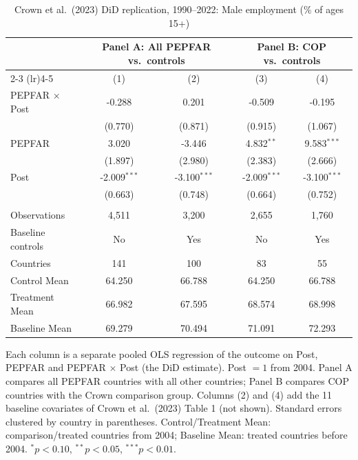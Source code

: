 
\begin{table}[htbp]
   \caption{\label{tab:crown_did_emp_male} Crown et al.\ (2023) DiD replication, 1990--2022: Male employment (\% of ages 15+)}
   \bigskip
   \centering
   \begin{tabular}{lcccc}
      \toprule
       & \multicolumn{2}{c}{Panel A: All PEPFAR vs.\ controls} & \multicolumn{2}{c}{Panel B: COP vs.\ controls} \\ \cmidrule(lr){2-3} \cmidrule(lr){4-5}
                            & (1)            & (2)            & (3)            & (4)\\  
      \midrule 
      PEPFAR $\times$ Post  & -0.288         & 0.201          & -0.509         & -0.195\\   
                            & (0.770)        & (0.871)        & (0.915)        & (1.067)\\   
      PEPFAR                & 3.020          & -3.446         & 4.832$^{**}$   & 9.583$^{***}$\\   
                            & (1.897)        & (2.980)        & (2.383)        & (2.666)\\   
      Post                  & -2.009$^{***}$ & -3.100$^{***}$ & -2.009$^{***}$ & -3.100$^{***}$\\   
                            & (0.663)        & (0.748)        & (0.664)        & (0.752)\\   
       \\
      Observations          & 4,511          & 3,200          & 2,655          & 1,760\\  
      Baseline controls     & No             & Yes            & No             & Yes\\  
      Countries             & 141            & 100            & 83             & 55\\  
      Control Mean          & 64.250         & 66.788         & 64.250         & 66.788\\  
      Treatment Mean        & 66.982         & 67.595         & 68.574         & 68.998\\  
      Baseline Mean         & 69.279         & 70.494         & 71.091         & 72.293\\  
      \bottomrule
   \end{tabular}
   
   \par \raggedright 
   Each column is a separate pooled OLS regression of the outcome on Post, PEPFAR and PEPFAR $\times$ Post (the DiD estimate). Post $= 1$ from 2004. Panel A compares all PEPFAR countries with all other countries; Panel B compares COP countries with the Crown comparison group. Columns (2) and (4) add the 11 baseline covariates of Crown et al.\ (2023) Table 1 (not shown). Standard errors clustered by country in parentheses. Control/Treatment Mean: comparison/treated countries from 2004; Baseline Mean: treated countries before 2004. $^{*}p<0.10$, $^{**}p<0.05$, $^{***}p<0.01$.
\end{table}


